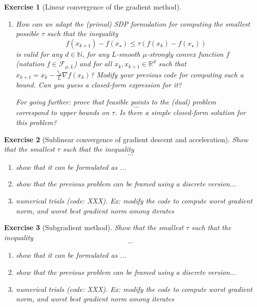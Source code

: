 \documentclass[11pt,a4paper]{article}
\newtheorem{exercise}{Exercise}
\begin{document}
\begin{exercise}[Linear convergence of the gradient method]
\begin{enumerate}
	For going further: prove that feasible points to the (dual) problem
	\begin{equation*}
	...
	\end{equation*}
	correspond to upper bounds on $\tau$. Are there simple closed-form solution for this problem?
	\item How can we adapt the (primal) SDP formulation for computing the smallest possible $\tau$ such that the inequality
	\[ f(x_{k+1})-f(x_\star) \leqslant \tau (f(x_{k})-f(x_\star))\]
	is valid for any $d\in\mathbb{N}$, for any $L$-smooth $\mu$-strongly convex function $f$ (notation $f\in\mathcal{F}_{\mu,L}$) and for all $x_k,x_{k+1}\in\mathbb{R}^d$ such that $x_{k+1}=x_k-\frac{\gamma_k}{L} \nabla f(x_k)$? Modify your previous code for computing such a bound. Can you guess a closed-form expression for it?
	
	For going further: prove that feasible points to the (dual) problem
	\begin{equation*}
	...
	\end{equation*}
	correspond to upper bounds on $\tau$. Is there a simple closed-form solution for this problem?
	\end{enumerate}
	\end{exercise}

	\begin{exercise}[Sublinear convergence of gradient descent and acceleration]
	Show that the smallest $\tau$ such that the inequality
	\[ ... \]
	\begin{enumerate}
	\item show that it can be formulated as ...
	\item show that the previous problem can be framed using a discrete version...
	\item numerical trials (code: XXX). Ex: modify the code to compute worst gradient norm, and worst best gradient norm among iterates
	\end{enumerate}
	\end{exercise}
	
\begin{exercise}[Subgradient method]
	Show that the smallest $\tau$ such that the inequality
	\[ ... \]
	\begin{enumerate}
	\item show that it can be formulated as ...
	\item show that the previous problem can be framed using a discrete version...
	\item numerical trials (code: XXX). Ex: modify the code to compute worst gradient norm, and worst best gradient norm among iterates
	\end{enumerate}
	\end{exercise}
	
\end{document}
